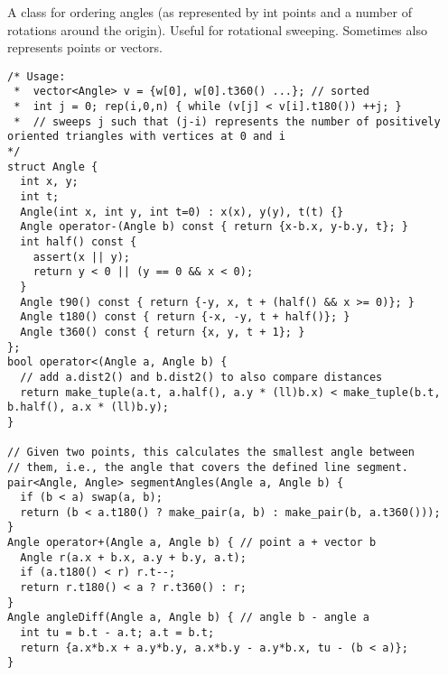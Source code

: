 A class for ordering angles (as represented by int points and a number of rotations around the origin). Useful for rotational sweeping.
Sometimes also represents points or vectors.
\begin{verbatim}
/* Usage:
 *  vector<Angle> v = {w[0], w[0].t360() ...}; // sorted
 *  int j = 0; rep(i,0,n) { while (v[j] < v[i].t180()) ++j; }
 *  // sweeps j such that (j-i) represents the number of positively oriented triangles with vertices at 0 and i
*/
struct Angle {
  int x, y;
  int t;
  Angle(int x, int y, int t=0) : x(x), y(y), t(t) {}
  Angle operator-(Angle b) const { return {x-b.x, y-b.y, t}; }
  int half() const {
    assert(x || y);
    return y < 0 || (y == 0 && x < 0);
  }
  Angle t90() const { return {-y, x, t + (half() && x >= 0)}; }
  Angle t180() const { return {-x, -y, t + half()}; }
  Angle t360() const { return {x, y, t + 1}; }
};
bool operator<(Angle a, Angle b) {
  // add a.dist2() and b.dist2() to also compare distances
  return make_tuple(a.t, a.half(), a.y * (ll)b.x) < make_tuple(b.t, b.half(), a.x * (ll)b.y);
}

// Given two points, this calculates the smallest angle between
// them, i.e., the angle that covers the defined line segment.
pair<Angle, Angle> segmentAngles(Angle a, Angle b) {
  if (b < a) swap(a, b);
  return (b < a.t180() ? make_pair(a, b) : make_pair(b, a.t360()));
}
Angle operator+(Angle a, Angle b) { // point a + vector b
  Angle r(a.x + b.x, a.y + b.y, a.t);
  if (a.t180() < r) r.t--;
  return r.t180() < a ? r.t360() : r;
}
Angle angleDiff(Angle a, Angle b) { // angle b - angle a
  int tu = b.t - a.t; a.t = b.t;
  return {a.x*b.x + a.y*b.y, a.x*b.y - a.y*b.x, tu - (b < a)};
}
\end{verbatim}
